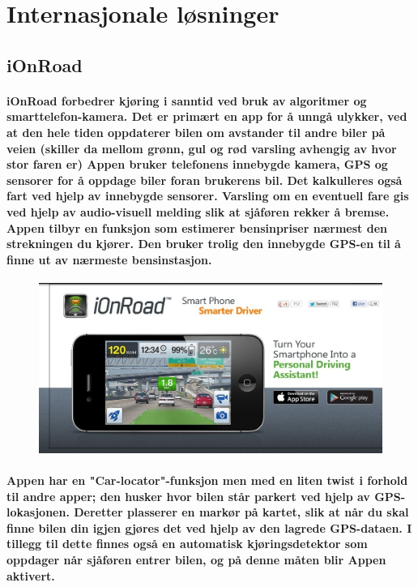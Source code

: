 \section{Internasjonale løsninger}

\subsection{iOnRoad}
\paragraph{iOnRoad forbedrer kjøring i sanntid ved bruk av algoritmer og smarttelefon-kamera. Det er primært en app for å unngå ulykker, ved at den hele tiden oppdaterer bilen om avstander til andre biler på veien (skiller da mellom grønn, gul og rød varsling avhengig av hvor stor faren er) Appen bruker telefonens innebygde kamera, GPS  og sensorer for å oppdage biler foran brukerens bil. Det kalkulleres også fart ved hjelp av innebygde sensorer. Varsling om en eventuell fare gis ved hjelp av audio-visuell melding slik at sjåføren rekker å bremse. Appen tilbyr en funksjon som estimerer bensinpriser nærmest den strekningen du kjører. Den bruker trolig den innebygde GPS-en til å finne ut av nærmeste bensinstasjon.}

\begin{figure}[p]
\centering
\includegraphics[scale=0.10]{img/iOnRoad.jpg}
\label{fig:iOnRoad1}
\end{figure}

\paragraph{Appen har en "Car-locator"-funksjon men med en liten twist i forhold til andre apper; den husker hvor bilen står parkert ved hjelp av GPS-lokasjonen. Deretter plasserer en markør på kartet, slik at når du skal finne bilen din igjen gjøres det ved hjelp av den lagrede GPS-dataen. I tillegg til dette finnes også en automatisk kjøringsdetektor som oppdager når sjåføren entrer bilen, og på denne måten blir Appen aktivert.}

